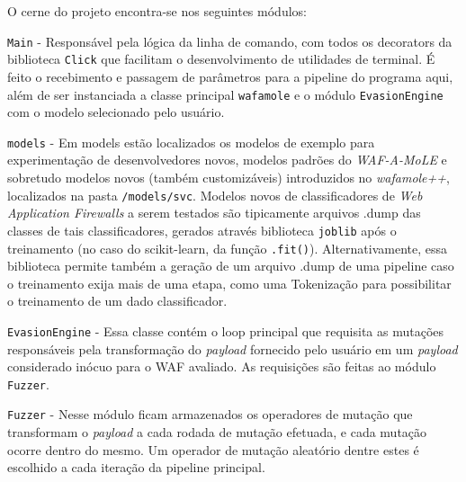 O cerne do projeto encontra-se nos seguintes módulos:
\begin{alineas}
\item \verb+Main+ - Responsável pela lógica da linha de comando, com todos os decorators da biblioteca \verb+Click+ que facilitam o desenvolvimento de utilidades de terminal. É feito o recebimento e passagem de parâmetros para a pipeline do programa aqui, além de ser instanciada a classe principal \verb+wafamole+ e o módulo \verb+EvasionEngine+ com o modelo selecionado pelo usuário.
\item \verb+models+ - Em models estão localizados os modelos de exemplo para experimentação de desenvolvedores novos, modelos padrões do \textit{WAF-A-MoLE} e sobretudo modelos novos (também customizáveis) introduzidos no \textit{wafamole++}, localizados na pasta \verb+/models/svc+. Modelos novos de classificadores de \textit{Web Application Firewalls} a serem testados são tipicamente arquivos .dump das classes de tais classificadores, gerados através biblioteca \verb+joblib+ após o treinamento (no caso do scikit-learn, da função \verb+.fit()+). Alternativamente, essa biblioteca permite também a geração de um arquivo .dump de uma pipeline caso o treinamento exija mais de uma etapa, como uma Tokenização para possibilitar o treinamento de um dado classificador.
\item \verb+EvasionEngine+ - Essa classe contém o loop principal que requisita as mutações responsáveis pela transformação do \textit{payload} fornecido pelo usuário em um \textit{payload} considerado inócuo para o WAF avaliado. As requisições são feitas ao módulo \verb+Fuzzer+.
\item \verb+Fuzzer+ - Nesse módulo ficam armazenados os operadores de mutação que transformam o \textit{payload} a cada rodada de mutação efetuada, e cada mutação ocorre dentro do mesmo. Um operador de mutação aleatório dentre estes é escolhido a cada iteração da pipeline principal.
\end{alineas}


